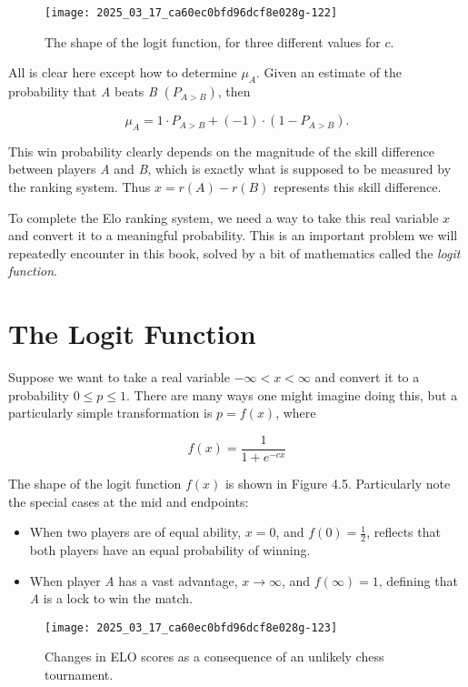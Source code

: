 \documentclass[10pt]{article}
\begin{document}
\begin{figure}[h]
    \centering
    \texttt{[image: 2025\_03\_17\_ca60ec0bfd96dcf8e028g-122]}
    \caption{The shape of the logit function, for three different values for \(c\).}
\end{figure}

All is clear here except how to determine \(\mu_A\). Given an estimate of the probability that \textit{A} beats \textit{B} \((P_{A>B})\), then

$$
\mu_A = 1 \cdot P_{A>B} + (-1) \cdot (1 - P_{A>B}).
$$

This win probability clearly depends on the magnitude of the skill difference between players \textit{A} and \textit{B}, which is exactly what is supposed to be measured by the ranking system. Thus \(x = r(A) - r(B)\) represents this skill difference.

To complete the Elo ranking system, we need a way to take this real variable \(x\) and convert it to a meaningful probability. This is an important problem we will repeatedly encounter in this book, solved by a bit of mathematics called the \textit{logit function}.

\section*{The Logit Function}
Suppose we want to take a real variable \(-\infty < x < \infty\) and convert it to a probability \(0 \leq p \leq 1\). There are many ways one might imagine doing this, but a particularly simple transformation is \(p = f(x)\), where

$$
f(x) = \frac{1}{1 + e^{-cx}}
$$

The shape of the logit function \(f(x)\) is shown in Figure 4.5. Particularly note the special cases at the mid and endpoints:

\begin{itemize}
    \item When two players are of equal ability, \(x = 0\), and \(f(0) = \frac{1}{2}\), reflects that both players have an equal probability of winning.
    \item When player \textit{A} has a vast advantage, \(x \rightarrow \infty\), and \(f(\infty) = 1\), defining that \textit{A} is a lock to win the match.
\end{itemize}

\begin{figure}[h]
    \centering
    \texttt{[image: 2025\_03\_17\_ca60ec0bfd96dcf8e028g-123]}
    \caption{Changes in ELO scores as a consequence of an unlikely chess tournament.}
\end{figure}
\end{document}

